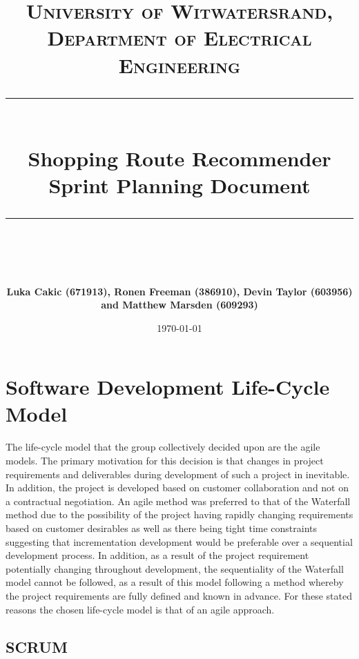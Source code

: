 \documentclass[10pt, a4paper, onecolumn]{scrartcl}
\newcommand{\horrule}[1]{\rule{\linewidth}{#1}}
\begin{document}
	
	\title{\normalfont \normalsize
		\textsc{University of Witwatersrand, Department of Electrical Engineering} \\ [10pt]
		\horrule{0.5pt} \\ [10pt]
		\huge Shopping Route Recommender \\ Sprint Planning Document \\
		\horrule{2pt} \\ [10pt]}
	\author{\textbf{\normalsize{Luka Cakic (671913), Ronen Freeman (386910), Devin Taylor (603956) and Matthew Marsden (609293)}} \\ [10pt]}
	\date {\normalsize \today}
	
	\maketitle
	
	\section{Software Development Life-Cycle Model}
	
		The life-cycle model that the group collectively decided upon are the agile models. The primary motivation for this decision is that changes in project requirements and deliverables during development of such a project in inevitable. In addition, the project is developed based on customer collaboration and not on a contractual negotiation. An agile method was preferred to that of the Waterfall method due to the possibility of the project having rapidly changing requirements based on customer desirables as well as there being tight time constraints suggesting that incrementation development would be preferable over a sequential development process. In addition, as a result of the project requirement potentially changing throughout development, the sequentiality of the Waterfall model cannot be followed, as a result of this model following a method whereby the project requirements are fully defined and known in advance. For these stated reasons the chosen life-cycle model is that of an agile approach. 
		
		\subsection{SCRUM}
		
\end{document}
